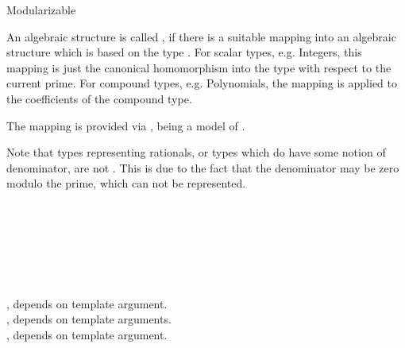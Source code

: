 \begin{ccRefConcept}{Modularizable}

\ccDefinition

An algebraic structure is called \ccRefName, if there is a suitable mapping 
into an algebraic structure which is based on the type . 
For scalar types, e.g. Integers, this mapping is just the canonical homomorphism 
into the type  with respect to the current prime. 
For compound types, e.g. Polynomials, 
the mapping is applied to the coefficients of the compound type. 

The mapping is provided via , 
being a model of .

Note that types representing rationals, or types which do have some notion 
of denominator, are not . 
This is due to the fact that the denominator may be zero modulo the prime, 
which can not be represented.  


\ccHasModels

\\
\\
\\
\\
\\
\\

, depends on template argument.\\ 
, depends on template arguments.\\
, depends on template argument.\\ 

\ccSeeAlso
{}\\
\\

\end{ccRefConcept}